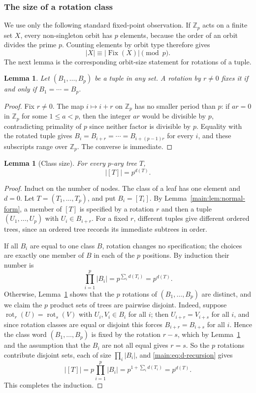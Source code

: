 \documentclass[11pt]{article}
\newtheorem{lemma}[theorem]{Lemma}
\theoremstyle{definition}
\theoremstyle{remark}
\numberwithin{equation}{section}
\numberwithin{figure}{section}
\newcommand{\Z}{\mathbb Z}
\newcommand{\rot}{\operatorname{rot}}
\DeclareMathOperator{\Fix}{Fix}
\begin{document}
\subsubsection{The size of a rotation class}
We use only the following standard fixed-point observation.  If $\Z_p$ acts on a finite set $X$, every non-singleton orbit has $p$ elements, because the order of an orbit divides the prime $p$.  Counting elements by orbit type therefore gives
\begin{equation}\label{main:eq:fixed-points}
 |X|\equiv|\Fix(X)|\pmod p.
\end{equation}
The next lemma is the corresponding orbit-size statement for rotations of a tuple.
\begin{lemma}\label{main:lem:tuple-rotation}
Let $(B_1,\ldots,B_p)$ be a tuple in any set.  A rotation by $r\ne0$ fixes it if and only if $B_1=\cdots=B_p$.
\end{lemma}
\begin{proof}
Fix $r\ne0$.  The map $i\mapsto i+r$ on $\Z_p$ has no smaller period than $p$: if $ar=0$ in $\Z_p$ for some $1\le a<p$, then the integer $ar$ would be divisible by $p$, contradicting primality of $p$ since neither factor is divisible by $p$.  Equality with the rotated tuple gives $B_i=B_{i+r}=\cdots=B_{i+(p-1)r}$ for every $i$, and these subscripts range over $\Z_p$.  The converse is immediate.
\end{proof}
\begin{lemma}[Class size]\label{main:lem:class-size}
For every $p$-ary tree $T$,
\[
 |[T]|=p^{d(T)}.
\]
\end{lemma}
\begin{proof}
Induct on the number of nodes.  The class of a leaf has one element and $d=0$.  Let $T=(T_1,\ldots,T_p)$, and put $B_i=[T_i]$.  By Lemma~\ref{main:lem:normal-form}, a member of $[T]$ is specified by a rotation $r$ and then a tuple $(U_1,\ldots,U_p)$ with $U_i\in B_{i+r}$.  For a fixed $r$, different tuples give different ordered trees, since an ordered tree records its immediate subtrees in order.

If all $B_i$ are equal to one class $B$, rotation changes no specification; the choices are exactly one member of $B$ in each of the $p$ positions.  By induction their number is
\[
 \prod_{i=1}^p|B_i|=p^{\sum_id(T_i)}=p^{d(T)}.
\]
Otherwise, Lemma~\ref{main:lem:tuple-rotation} shows that the $p$ rotations of $(B_1,\ldots,B_p)$ are distinct, and we claim the $p$ product sets of trees are pairwise disjoint.  Indeed, suppose $\rot_r(U)=\rot_s(V)$ with $U_i,V_i\in B_i$ for all $i$; then $U_{i+r}=V_{i+s}$ for all $i$, and since rotation classes are equal or disjoint this forces $B_{i+r}=B_{i+s}$ for all $i$.  Hence the class word $(B_1,\ldots,B_p)$ is fixed by the rotation $r-s$, which by Lemma~\ref{main:lem:tuple-rotation} and the assumption that the $B_i$ are not all equal gives $r=s$.  So the $p$ rotations contribute disjoint sets, each of size $\prod_i|B_i|$, and \eqref{main:eq:d-recursion} gives
\[
 |[T]|=p\prod_{i=1}^p|B_i|=p^{1+\sum_id(T_i)}=p^{d(T)}.
\]
This completes the induction.
\end{proof}
\end{document}
